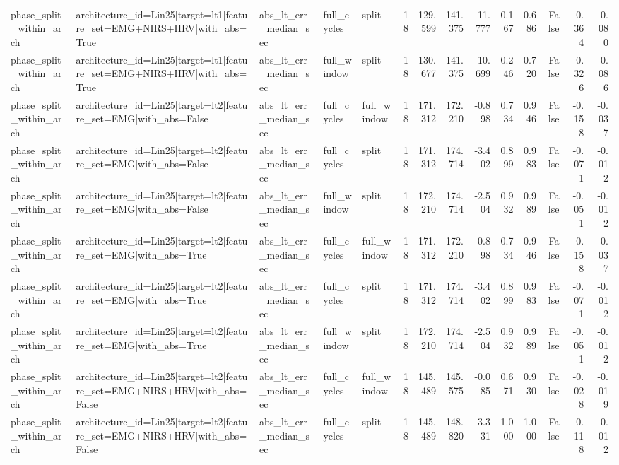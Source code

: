 \begin{table}
\begin{tabular}{lllllrrrrrrrrr}
phase_split_within_arch & architecture_id=Lin25|target=lt1|feature_set=EMG+NIRS+HRV|with_abs=True & abs_lt_err_median_sec & full_cycles & split & 18 & 129.599 & 141.375 & -11.777 & 0.167 & 0.686 & False & -0.364 & -0.080 \\
phase_split_within_arch & architecture_id=Lin25|target=lt1|feature_set=EMG+NIRS+HRV|with_abs=True & abs_lt_err_median_sec & full_window & split & 18 & 130.677 & 141.375 & -10.699 & 0.246 & 0.720 & False & -0.326 & -0.086 \\
phase_split_within_arch & architecture_id=Lin25|target=lt2|feature_set=EMG|with_abs=False & abs_lt_err_median_sec & full_cycles & full_window & 18 & 171.312 & 172.210 & -0.898 & 0.734 & 0.946 & False & -0.158 & -0.037 \\
phase_split_within_arch & architecture_id=Lin25|target=lt2|feature_set=EMG|with_abs=False & abs_lt_err_median_sec & full_cycles & split & 18 & 171.312 & 174.714 & -3.402 & 0.899 & 0.983 & False & -0.071 & -0.012 \\
phase_split_within_arch & architecture_id=Lin25|target=lt2|feature_set=EMG|with_abs=False & abs_lt_err_median_sec & full_window & split & 18 & 172.210 & 174.714 & -2.504 & 0.932 & 0.989 & False & -0.051 & -0.012 \\
phase_split_within_arch & architecture_id=Lin25|target=lt2|feature_set=EMG|with_abs=True & abs_lt_err_median_sec & full_cycles & full_window & 18 & 171.312 & 172.210 & -0.898 & 0.734 & 0.946 & False & -0.158 & -0.037 \\
phase_split_within_arch & architecture_id=Lin25|target=lt2|feature_set=EMG|with_abs=True & abs_lt_err_median_sec & full_cycles & split & 18 & 171.312 & 174.714 & -3.402 & 0.899 & 0.983 & False & -0.071 & -0.012 \\
phase_split_within_arch & architecture_id=Lin25|target=lt2|feature_set=EMG|with_abs=True & abs_lt_err_median_sec & full_window & split & 18 & 172.210 & 174.714 & -2.504 & 0.932 & 0.989 & False & -0.051 & -0.012 \\
phase_split_within_arch & architecture_id=Lin25|target=lt2|feature_set=EMG+NIRS+HRV|with_abs=False & abs_lt_err_median_sec & full_cycles & full_window & 18 & 145.489 & 145.575 & -0.085 & 0.671 & 0.930 & False & -0.028 & -0.019 \\
phase_split_within_arch & architecture_id=Lin25|target=lt2|feature_set=EMG+NIRS+HRV|with_abs=False & abs_lt_err_median_sec & full_cycles & split & 18 & 145.489 & 148.820 & -3.331 & 1.000 & 1.000 & False & -0.118 & -0.012 \\

\end{tabular}
\end{table}

